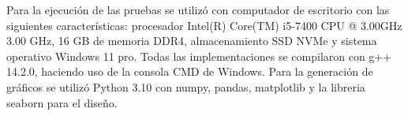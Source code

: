 Para la ejecución de las pruebas se utilizó con computador de escritorio con las siguientes características: procesador Intel(R) Core(TM) i5-7400 CPU @ 3.00GHz   3.00 GHz, 16 GB de memoria DDR4, almacenamiento SSD NVMe y sistema operativo Windows 11 pro. Todas las implementaciones se compilaron con g++ 14.2.0, haciendo uso de la consola CMD de Windows. Para la generación de gráficos se utilizó Python 3.10 con numpy, pandas, matplotlib y la libreria seaborn para el diseño.
